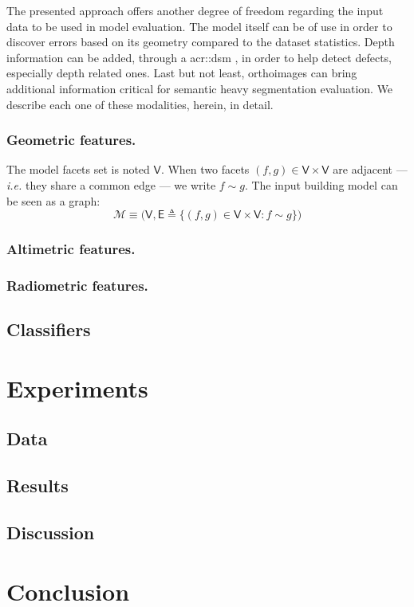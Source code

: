 \documentclass[runningheads]{llncs}
\begin{document}
The presented approach offers another degree of freedom regarding the input data to be used in model evaluation. The model itself can be of use in order to discover errors based on its geometry compared to the dataset statistics. Depth information can be added, through a \acrshort{acr::dsm} , in order to help detect defects, especially depth related ones. Last but not least, orthoimages can bring additional information critical for semantic heavy segmentation evaluation. We describe each one of these modalities, herein, in detail.

\subsubsection{Geometric features.}
The model facets set is noted $\mathsf{V}$. When two facets $(f, g) \in \mathsf{V} \times \mathsf{V}$ are adjacent --- \textit{i.e.} they share a common edge --- we write $f \sim g$. The input building model can be seen as a graph:
\begin{equation}
	\label{eq::model_graph}
	\mathscr{M} \equiv \Big(\mathsf{V}, \mathsf{E} \triangleq \big\{ (f, g) \in \mathsf{V} \times \mathsf{V} : f \sim g \big\} \Big)
\end{equation}

\subsubsection{Altimetric features.}

\subsubsection{Radiometric features.}

\subsection{Classifiers}
\section{Experiments}
\subsection{Data}
\subsection{Results}
\subsection{Discussion}
\section{Conclusion}



\end{document}
